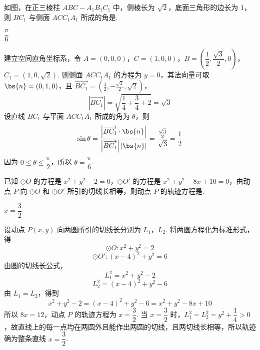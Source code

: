 \begin{problem}
如图，在正三棱柱 \(ABC - A_{1}B_{1}C_{1}\) 中，侧棱长为 \(\sqrt{2}\)，底面三角形的边长为 1，则 \(BC_{1}\) 与侧面 \(ACC_{1}A_{1}\) 所成的角是\fillinblank{}.
\end{problem}

\begin{answer}
\(\dfrac{\pi}{6}\)
\end{answer}

\begin{solution}
建立空间直角坐标系，令 \(A=(0,0,0)\)，\(C=(1,0,0)\)，\(B=\left(\dfrac12,\dfrac{\sqrt3}{2},0\right)\)，\(C_{1}=(1,0,\sqrt2)\). 则侧面 \(ACC_{1}A_{1}\) 的方程为 \(y=0\)，其法向量可取 \(\bs{n}=(0,1,0)\)，且 \(\overrightarrow{BC_{1}}=\left(\frac12,-\frac{\sqrt3}{2},\sqrt2\right)\)，
\[
\left|\overrightarrow{BC_{1}}\right|=\sqrt{\frac14+\frac34+2}=\sqrt3
\]
设直线 \(BC_{1}\) 与平面 \(ACC_{1}A_{1}\) 所成的角为 \(\theta\)，则
\[
\sin\theta=\frac{\left|\overrightarrow{BC_{1}}\cdot\bs{n}\right|}{\left|\overrightarrow{BC_{1}}\right|\left|\bs{n}\right|}
 =\frac{\frac{\sqrt3}{2}}{\sqrt3}=\frac12
\]
因为 \(0\leqslant\theta\leqslant\dfrac\pi2\)，所以 \(\theta=\dfrac\pi6\).
\end{solution}

\begin{problem}
已知 \(\odot O\) 的方程是 \(x^{2} + y^{2} - 2 = 0\)，\(\odot O'\) 的方程是 \(x^{2} + y^{2} - 8x + 10 = 0\)，由动点 \(P\) 向 \(\odot O\) 和 \(\odot O'\) 所引的切线长相等，则动点 \(P\) 的轨迹方程是\fillinblank{}.
\end{problem}

\begin{answer}
\(x=\dfrac32\)
\end{answer}

\begin{solution}
设动点 \(P(x,y)\) 向两圆所引的切线长分别为 \(L_{1}\)，\(L_{2}\). 将两圆方程化为标准形式，得
\[
\odot O:x^{2}+y^{2}=2
\]
\[
\odot O':(x-4)^{2}+y^{2}=6
\]
由圆的切线长公式，
\[
L_{1}^{2}=x^{2}+y^{2}-2
\]
\[
L_{2}^{2}=(x-4)^{2}+y^{2}-6
\]
由 \(L_{1}=L_{2}\)，得到
\[
x^{2}+y^{2}-2=(x-4)^{2}+y^{2}-6=x^{2}+y^{2}-8x+10
\]
所以 \(8x=12\)，动点 \(P\) 的轨迹方程为 \(x=\dfrac32\).
当 \(x=\dfrac32\) 时，\(L_{1}^{2}=L_{2}^{2}=y^{2}+\dfrac14>0\)，故直线上的每一点均在两圆外且能作出两圆的切线，且两切线长相等，所以轨迹确为整条直线 \(x=\dfrac32\).
\end{solution}

